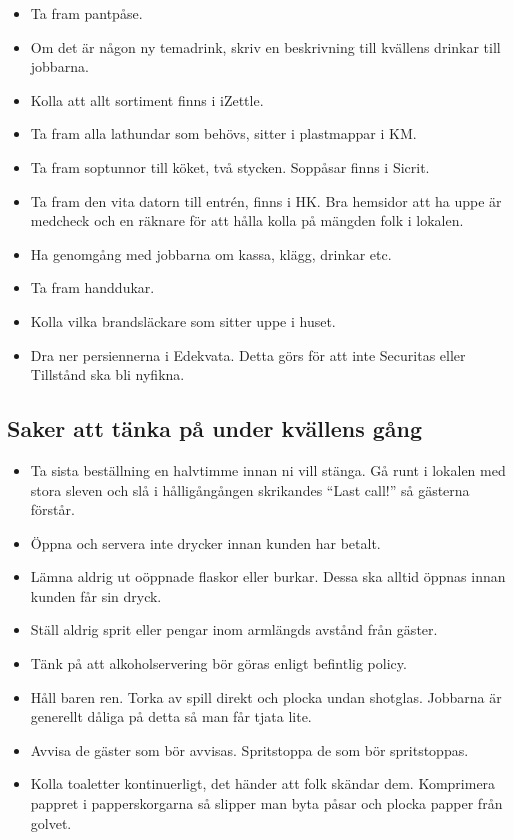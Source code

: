 \documentclass[10pt]{article}
\begin{document}
\begin{itemize}
        \item Ta fram pantpåse.
        \item Om det är någon ny temadrink, skriv en beskrivning till kvällens drinkar till jobbarna.
        \item Kolla att allt sortiment finns i iZettle.
        \item Ta fram alla lathundar som behövs, sitter i plastmappar i KM.
        \item Ta fram soptunnor till köket, två stycken. Soppåsar finns i Sicrit.
        \item Ta fram den vita datorn till entrén, finns i HK. Bra hemsidor att ha uppe är medcheck och en räknare för att hålla kolla på mängden folk i lokalen.
        \item Ha genomgång med jobbarna om kassa, klägg, drinkar etc.
        \item Ta fram handdukar.
        \item Kolla vilka brandsläckare som sitter uppe i huset.
        \item Dra ner persiennerna i Edekvata. Detta görs för att inte Securitas eller Tillstånd ska bli nyfikna.

    \end{itemize}

    \subsection{Saker att tänka på under kvällens gång}
    \begin{itemize}
        \item Ta sista beställning en halvtimme innan ni vill stänga. Gå runt i lokalen med stora sleven och slå i hålligångången skrikandes ``Last call!'' så gästerna förstår.
        \item Öppna och servera inte drycker innan kunden har betalt.
        \item Lämna aldrig ut oöppnade flaskor eller burkar. Dessa ska alltid öppnas innan kunden får sin dryck.
        \item Ställ aldrig sprit eller pengar inom armlängds avstånd från gäster.
        \item Tänk på att alkoholservering bör göras enligt befintlig policy.
        \item Håll baren ren. Torka av spill direkt och plocka undan shotglas. Jobbarna är generellt dåliga på detta så man får tjata lite.
        \item Avvisa de gäster som bör avvisas. Spritstoppa de som bör spritstoppas.
        \item Kolla toaletter kontinuerligt, det händer att folk skändar dem. Komprimera pappret i papperskorgarna så slipper man byta påsar och plocka papper från golvet.

    \end{itemize}
\end{document}
